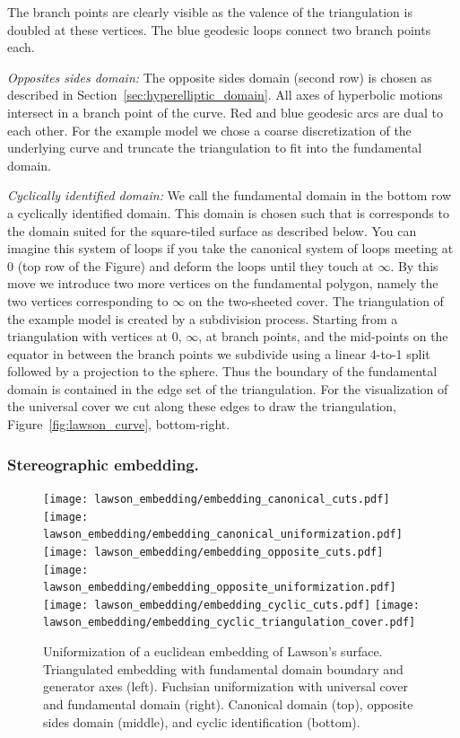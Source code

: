 \documentclass[Thesis]{subfiles}
\begin{document}
The branch points are clearly visible as the valence of the triangulation is doubled at these vertices.
The blue geodesic loops connect two branch points each.

\textit{Opposites sides domain:}
The opposite sides domain (second row) is chosen as described in Section~\ref{sec:hyperelliptic_domain}.
All axes of hyperbolic motions intersect in a branch point of the curve.
Red and blue geodesic arcs are dual to each other.
For the example model we chose a coarse discretization of the underlying curve and truncate the triangulation to fit into the fundamental domain.

\textit{Cyclically identified domain:}
We call the fundamental domain in the bottom row a cyclically identified domain.
This domain is chosen such that is corresponds to the domain suited for the square-tiled surface as described below.
You can imagine this system of loops if you take the canonical system of loops meeting at $0$ (top row of the Figure) and deform the loops until they touch at $\infty$.
By this move we introduce two more vertices on the fundamental polygon, namely the two vertices corresponding to $\infty$ on the two-sheeted cover.
The triangulation of the example model is created by a subdivision process.
Starting from  a triangulation with vertices at $0$, $\infty$, at branch points, and the mid-points on the equator in between the branch points we subdivide using a linear 4-to-1 split followed by a projection to the sphere. Thus the boundary of the fundamental domain is contained in the edge set of the triangulation. For the visualization of the universal cover we cut along these edges to draw the triangulation, Figure~\ref{fig:lawson_curve}, bottom-right.

\subsubsection{Stereographic embedding.}

\begin{figure}
	\centering
	\resizebox{!}{6cm} {
	\texttt{[image: lawson\_embedding/embedding\_canonical\_cuts.pdf]}
	\texttt{[image: lawson\_embedding/embedding\_canonical\_uniformization.pdf]}
	}
	\resizebox{!}{6cm} {
	\texttt{[image: lawson\_embedding/embedding\_opposite\_cuts.pdf]}
	\texttt{[image: lawson\_embedding/embedding\_opposite\_uniformization.pdf]}
	}
	\resizebox{!}{6.5cm} {
	\texttt{[image: lawson\_embedding/embedding\_cyclic\_cuts.pdf]}
	\texttt{[image: lawson\_embedding/embedding\_cyclic\_triangulation\_cover.pdf]}
	}
	\caption{Uniformization of a euclidean embedding of Lawson's surface. Triangulated embedding with fundamental domain boundary and generator axes (left). Fuchsian uniformization with universal cover and fundamental domain (right). Canonical domain (top), opposite sides domain (middle), and cyclic identification (bottom).}
	\label{fig:lawson_embedding}
\end{figure}
\end{document}
